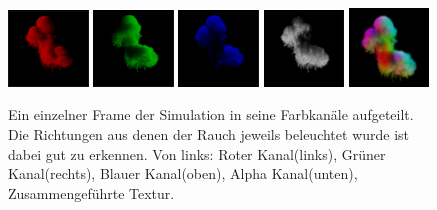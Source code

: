 \begin{figure}[h!]
	\centering
	\includegraphics[width=0.19\textwidth]{Grafiken/Implementation/Lightmaps/T1_R.png}
	\includegraphics[width=0.19\textwidth]{Grafiken/Implementation/Lightmaps/T1_G.png}
	\includegraphics[width=0.19\textwidth]{Grafiken/Implementation/Lightmaps/T1_B.png}
	\includegraphics[width=0.19\textwidth]{Grafiken/Implementation/Lightmaps/T1_A.png}
	\includegraphics[width=0.19\textwidth]{Grafiken/Implementation/Lightmaps/merged.png}

	\begin{footnotesize}
		\caption{Ein einzelner Frame der Simulation in seine Farbkanäle aufgeteilt. Die Richtungen aus denen der Rauch jeweils beleuchtet wurde ist dabei gut zu erkennen.
			Von links: Roter Kanal(links), Grüner Kanal(rechts), Blauer Kanal(oben), Alpha Kanal(unten), Zusammengeführte Textur.}
		\label{fig:lightDirections}
	\end{footnotesize}
\end{figure}








